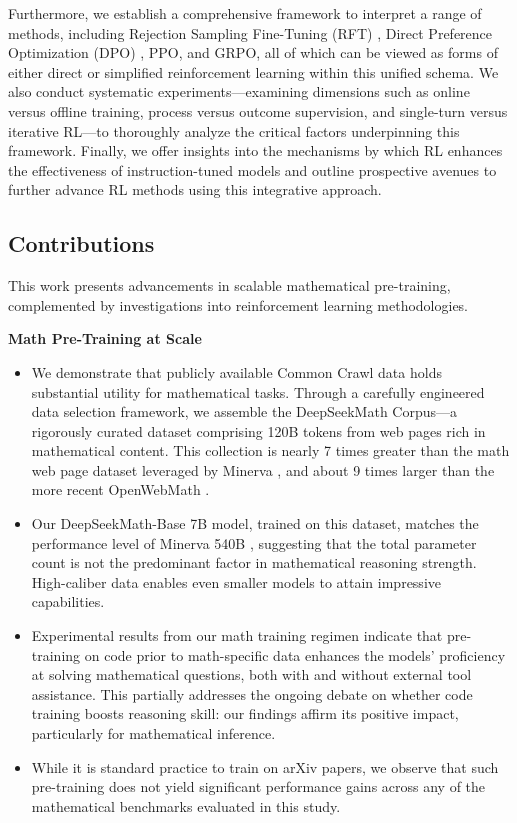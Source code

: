 Furthermore, we establish a comprehensive framework to interpret a range of methods, including Rejection Sampling Fine-Tuning (RFT) \citep{yuan2023scaling}, Direct Preference Optimization (DPO) \citep{dpo}, PPO, and GRPO, all of which can be viewed as forms of either direct or simplified reinforcement learning within this unified schema. We also conduct systematic experiments—examining dimensions such as online versus offline training, process versus outcome supervision, and single-turn versus iterative RL—to thoroughly analyze the critical factors underpinning this framework. Finally, we offer insights into the mechanisms by which RL enhances the effectiveness of instruction-tuned models and outline prospective avenues to further advance RL methods using this integrative approach.

\subsection{Contributions}
This work presents advancements in scalable mathematical pre-training, complemented by investigations into reinforcement learning methodologies.

\textbf{Math Pre-Training at Scale}

\begin{itemize}[topsep=0pt]
    \item We demonstrate that publicly available Common Crawl data holds substantial utility for mathematical tasks. Through a carefully engineered data selection framework, we assemble the DeepSeekMath Corpus—a rigorously curated dataset comprising 120B tokens from web pages rich in mathematical content. This collection is nearly 7 times greater than the math web page dataset leveraged by Minerva \citep{minerva}, and about 9 times larger than the more recent OpenWebMath \citep{openwebmath}.

    \item Our DeepSeekMath-Base 7B model, trained on this dataset, matches the performance level of Minerva 540B \citep{minerva}, suggesting that the total parameter count is not the predominant factor in mathematical reasoning strength. High-caliber data enables even smaller models to attain impressive capabilities.

    \item Experimental results from our math training regimen indicate that pre-training on code prior to math-specific data enhances the models’ proficiency at solving mathematical questions, both with and without external tool assistance. This partially addresses the ongoing debate on whether code training boosts reasoning skill: our findings affirm its positive impact, particularly for mathematical inference.

    \item While it is standard practice to train on arXiv papers, we observe that such pre-training does not yield significant performance gains across any of the mathematical benchmarks evaluated in this study.
\end{itemize}

